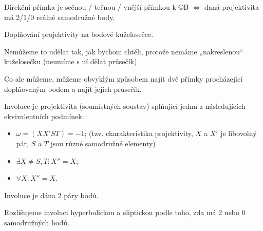 \documentclass[12pt]{article}					%
\begin{document}
\begin{poznamka}
	Direkční přímka je sečnou / tečnou / vnější přímkou k ©B $\Leftrightarrow$ daná projektivita má 2/1/0 reálné samodružné body.
\end{poznamka}

\begin{priklad}[Konstrukce]
	Doplňování projektivity na bodové kuželosečce.

	\begin{reseni}
		Nemůžeme to udělat tak, jak bychom chtěli, protože nemáme „nakreslenou“ kuželosečku (neumíme s ní dělat průsečík).

		Co ale můžeme, můžeme obvyklým způsobem najít dvě přímky procházející doplňovaným bodem a najít jejich průsečík.
	\end{reseni}
\end{priklad}

\begin{definice}
	Involuce je projektivita (soumístných soustav) splňující jednu z následujících ekvivalentních podmínek:
	\begin{itemize}
		\item $ω = (XX'ST) = -1$; (tzv. charakteristika projektivity, $X$ a $X'$ je libovolný pár, $S$ a $T$ jsou různé samodružné elementy)
		\item $\exists X ≠ S, T: X'' = X$;
		\item $\forall X: X'' = X$.
	\end{itemize}
\end{definice}

\begin{poznamka}
	Involuce je dána 2 páry bodů.

	Rozlišujeme involuci hyperbolickou a eliptickou podle toho, zda má 2 nebo 0 samodružných bodů.
\end{poznamka}
\end{document}
